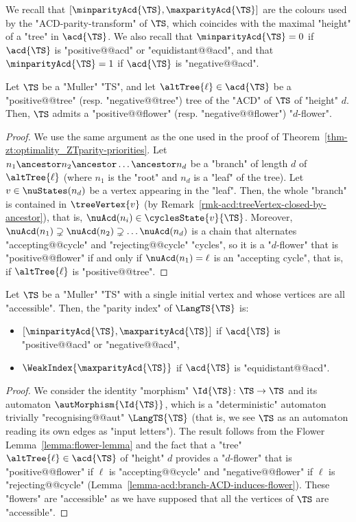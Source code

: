 \documentclass{theoretics}
\begin{document}
We recall that $[\minparityAcd{\TS}, \maxparityAcd{\TS}]$ are the colours used by the "ACD-parity-transform" of $\TS$, which coincides with the maximal "height" of a "tree" in $\acd{\TS}$.
We also recall that $\minparityAcd{\TS}=0$ if $\acd{\TS}$ is "positive@@acd" or "equidistant@@acd", and that $\minparityAcd{\TS}=1$ if $\acd{\TS}$ is "negative@@acd".


\begin{lemma}\label{lemma-acd:branch-ACD-induces-flower}
	Let $\TS$ be a "Muller" "TS", and let $\altTree{\ell}\in \acd{\TS}$ be a "positive@@tree" (resp. "negative@@tree") tree of the "ACD" of $\TS$ of "height" $d$. Then, $\TS$ admits a "positive@@flower" (resp. "negative@@flower") "$d$-flower".
\end{lemma}
\begin{proof}
	We use the same argument as the one used in the proof of Theorem~\ref{thm-zt:optimality_ZTparity-priorities}. Let $n_1\ancestor n_2\ancestor \dots \ancestor n_d$ be a "branch" of length $d$ of $\altTree{\ell}$ (where $n_1$ is the "root" and $n_d$ is a "leaf" of the tree). Let $v\in \nuStates(n_d)$ be a vertex appearing in the "leaf". Then, the whole "branch" is contained in $\treeVertex{v}$ (by Remark~\ref{rmk-acd:treeVertex-closed-by-ancestor}), that is, $\nuAcd(n_i)\in \cyclesState{v}{\TS}$. Moreover, $\nuAcd(n_1)\supsetneq \nuAcd(n_2)\supsetneq \dots \nuAcd(n_d)$ is a chain that alternates "accepting@@cycle" and "rejecting@@cycle" "cycles", so it is a "$d$-flower" that is "positive@@flower" if and only if $\nuAcd(n_1) = \ell$ is an "accepting cycle", that is, if $\altTree{\ell}$ is "positive@@tree".
\end{proof}

\begin{lemma}\label{lemma-acd:parity index-muller-TS}
	Let $\TS$ be a "Muller" "TS" with a single initial vertex and whose vertices are all "accessible". Then, the "parity index" of $\LangTS{\TS}$ is:
	\begin{itemize}
		\item $[\minparityAcd{\TS}, \maxparityAcd{\TS}]$ if $\acd{\TS}$ is "positive@@acd" or "negative@@acd",
		\item $\WeakIndex{\maxparityAcd{\TS}}$ if $\acd{\TS}$ is "equidistant@@acd".
	\end{itemize}
\end{lemma}
\begin{proof}
	We consider the identity "morphism" $\Id{\TS}\colon \TS \to \TS$ and its automaton $\autMorphism{\Id{\TS}}$, which is a "deterministic" automaton trivially "recognising@@aut" $\LangTS{\TS}$ (that is, we see $\TS$ as an automaton reading its own edges as "input letters").
	The result follows from the Flower Lemma~\ref{lemma:flower-lemma} and the fact that a "tree" $\altTree{\ell}\in \acd{\TS}$ of "height" $d$ provides a "$d$-flower" that is "positive@@flower" if $\ell$ is "accepting@@cycle" and "negative@@flower" if  $\ell$ is "rejecting@@cycle" (Lemma~\ref{lemma-acd:branch-ACD-induces-flower}). These "flowers" are "accessible" as we have supposed that all the vertices of $\TS$ are "accessible".
\end{proof}
\end{document}
